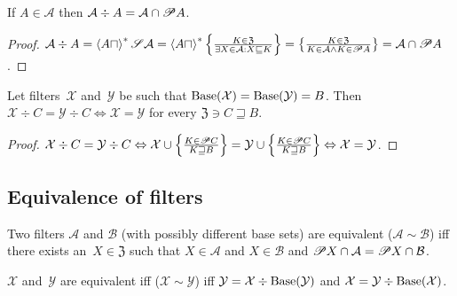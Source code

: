 \begin{prop}
If $A\in\mathcal{A}$ then
$\mathcal{A}\div A=\mathcal{A}\cap\mathscr{P} A$.
\end{prop}

\begin{proof}
$\mathcal{A}\div A=
\left\langle A\sqcap\right\rangle ^{\ast}\mathscr{S}\mathcal{A} =
\left\langle A\sqcap\right\rangle ^{\ast}\left\{ \frac{K\in\mathfrak{Z}}{
\exists X\in\mathcal{A}:X\sqsubseteq K}\right\} =
\left\{ \frac{K\in\mathfrak{Z}}{
K\in\mathcal{A}\land K\in\mathscr{P} A}\right\} =
\mathcal{A}\cap\mathscr{P} A$.
\end{proof}

\begin{prop}
Let filters~$\mathcal{X}$
and~$\mathcal{Y}$ be such that
$\operatorname{Base}(\mathcal{X})=\operatorname{Base}(\mathcal{Y})=B$. Then
$\mathcal{X}\div C=\mathcal{Y}\div C
\Leftrightarrow \mathcal{X}=\mathcal{Y}$ for every
$\mathfrak{Z}\ni C\sqsupseteq B$.
\end{prop}

\begin{proof}
$\mathcal{X}\div C=\mathcal{Y}\div C\Leftrightarrow
\mathcal{X}\cup\left\{ \frac{K\in\mathscr{P} C}{K\sqsupseteq B}\right\} = \mathcal{Y}\cup\left\{ \frac{K\in\mathscr{P} C}{K\sqsupseteq B}\right\} \Leftrightarrow
\mathcal{X}=\mathcal{Y}$.
\end{proof}

\subsection{Equivalence of filters}

\begin{defn}
Two filters $\mathcal{A}$ and $\mathcal{B}$
(with possibly different base sets) are equivalent ($\mathcal{A}\sim\mathcal{B}$)
iff there exists an~$X\in\mathfrak{Z}$ such that $X\in\mathcal{A}$ and $X\in\mathcal{B}$
and $\mathscr{P} X\cap\mathcal{A}=\mathscr{P} X\cap\mathcal{B}$.\end{defn}

\begin{prop}
$\mathcal{X}$ and~$\mathcal{Y}$ are equivalent iff
($\mathcal{X}\sim\mathcal{Y}$) iff
$\mathcal{Y} = \mathcal{X} \div \operatorname{Base}(\mathcal{Y})$ and
$\mathcal{X} = \mathcal{Y} \div \operatorname{Base}(\mathcal{X})$.\end{prop}

